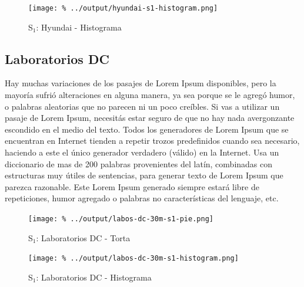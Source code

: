 \documentclass[final,inline,a4paper,narroweqnarray]{ieee}
\begin{document}
    \begin{figure}[ht]\begin{center}
      \texttt{[image: \%
      ../output/hyundai-s1-histogram.png]}
      \vspace{-2em}
      \caption{S$_1$: Hyundai - Histograma}
      \label{hyundai-s1-histogram}
    \end{center}\end{figure}

  \subsection{Laboratorios DC}

Hay muchas variaciones de los pasajes de Lorem Ipsum disponibles, pero la mayoría sufrió alteraciones en alguna manera, ya sea porque se le agregó humor, o palabras aleatorias que no parecen ni un poco creíbles. Si vas a utilizar un pasaje de Lorem Ipsum, necesitás estar seguro de que no hay nada avergonzante escondido en el medio del texto. Todos los generadores de Lorem Ipsum que se encuentran en Internet tienden a repetir trozos predefinidos cuando sea necesario, haciendo a este el único generador verdadero (válido) en la Internet. Usa un diccionario de mas de 200 palabras provenientes del latín, combinadas con estructuras muy útiles de sentencias, para generar texto de Lorem Ipsum que parezca razonable. Este Lorem Ipsum generado siempre estará libre de repeticiones, humor agregado o palabras no características del lenguaje, etc.

    \begin{figure}[ht]\begin{center}
      \texttt{[image: \%
      ../output/labos-dc-30m-s1-pie.png]}
      \vspace{-2em}
      \caption{S$_1$: Laboratorios DC - Torta}
      \label{labos-dc-30m-s1-pie}
    \end{center}\end{figure}

    \begin{figure}[ht]\begin{center}
      \texttt{[image: \%
      ../output/labos-dc-30m-s1-histogram.png]}
      \caption{S$_1$: Laboratorios DC - Histograma}
      \label{labos-dc-30m-s1-histogram}
    \end{center}\end{figure}
\end{document}
